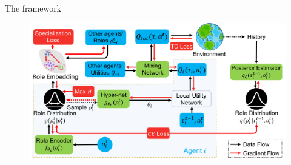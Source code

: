 \documentclass{beamer}
\begin{document}
    \begin{frame}{The framework}

        \begin{figure}
            \centering
            \includegraphics[width=1\linewidth]{img/framework.pdf}
        \end{figure}


    \end{frame}
\end{document}
